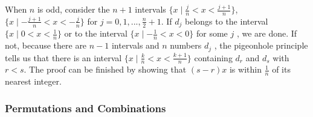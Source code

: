 \documentclass{../../cls/sig-alternate-05-2015}
\begin{document}
\begin{enumerate}
    When $n$ is odd, consider the $n + 1$ intervals $\{x \mid \frac{j}{n} < x < \frac{j + 1}{n}\}$, $\{x \mid -\frac{j + 1}{n} < x < -\frac{j}{n}\}$ for $j = 0, 1, . . . , \frac{n}{2} + 1$. If $d_j$ belongs to the interval $\{x \mid 0 < x < \frac{1}{n}\}$ or to the interval $\{x \mid -\frac{1}{n} < x < 0\}$ for some $j$ , we are done. If not, because there are $n - 1$ intervals    and $n$ numbers $d_j$ , the pigeonhole principle tells us that there is an interval $\{x \mid \frac{k}{n} < x < \frac{k + 1}{n}\}$ containing $d_r$ and $d_s$ with $r < s$. The proof can be finished by showing that $(s - r)x$ is within $\frac{1}{n}$ of its nearest integer.
\end{enumerate}
\subsubsection{Permutations and Combinations}
\end{document}
